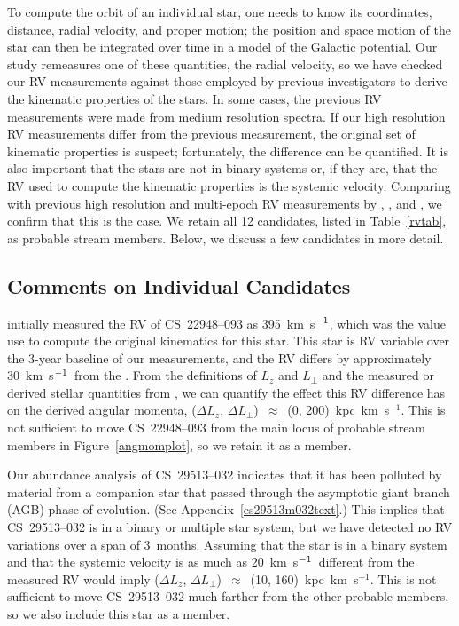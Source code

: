 \documentclass{emulateapj}
\def\kmsec{\mbox{km~s$^{\rm -1}$}}
\begin{document}
To compute the orbit of an individual star, one needs to know its
coordinates, distance, radial velocity, and proper motion;
the position and space motion of the star can then be integrated
over time in a model of the Galactic potential.
Our study remeasures one of these quantities, the radial velocity,
so we have checked our RV measurements against those employed by previous
investigators to derive the kinematic properties of the stars.
In some cases, the previous RV measurements were made from 
medium resolution spectra.
If our high resolution 
RV measurements differ from the previous measurement,
the original set of kinematic properties is suspect;
fortunately, the difference can be quantified.
It is also important that the stars are not in binary systems
or, if they are, that the RV used to compute the kinematic properties
is the systemic velocity.
Comparing with previous high resolution and multi-epoch RV measurements by
\citet{latham91}, \citet{carney03,carney08}, and \citet{zhang09},
we confirm that this is the case.
We retain all 12 candidates, listed in Table~\ref{rvtab}, 
as probable stream members. 
Below, we discuss a few candidates in more detail.


\subsection{Comments on Individual Candidates}


\citet{beers92} initially measured the RV of \mbox{CS~22948--093} 
as 395~\kmsec, which was the value use to compute the original 
kinematics for this star.
This star is RV variable over the 3-year baseline of our measurements,
and the RV differs by approximately 30~\kmsec\ from the \citet{beers92}.
From the definitions of $L_{z}$ and $L_{\perp}$ and the
measured or derived stellar quantities from \citet{beers00}, 
we can quantify the
effect this RV difference has on the derived angular momenta,
($\Delta L_{z}$, $\Delta L_{\perp}$)~$\approx$~(0, 200)~kpc~km~s$^{-1}$.
This is not sufficient to move \mbox{CS~22948--093} from the main
locus of probable stream members in Figure~\ref{angmomplot}, 
so we retain it as a member.

Our abundance analysis of \mbox{CS~29513--032} indicates that it 
has been polluted by material from a companion star that passed through
the asymptotic giant branch (AGB) phase of evolution.
(See Appendix~\ref{cs29513m032text}.)
This implies that \mbox{CS~29513--032} is in a binary
or multiple star system, but we have detected 
no RV variations over a span of 3~months.
Assuming that the star is in a binary system and that 
the systemic velocity is as much as 20~\kmsec\ 
different from the measured RV would imply
($\Delta L_{z}$, $\Delta L_{\perp}$)~$\approx$~(10, 160)~kpc~km~s$^{-1}$.
This is not sufficient to move \mbox{CS~29513--032} 
much farther from the other probable members, so
we also include this star as a member.
\end{document}
